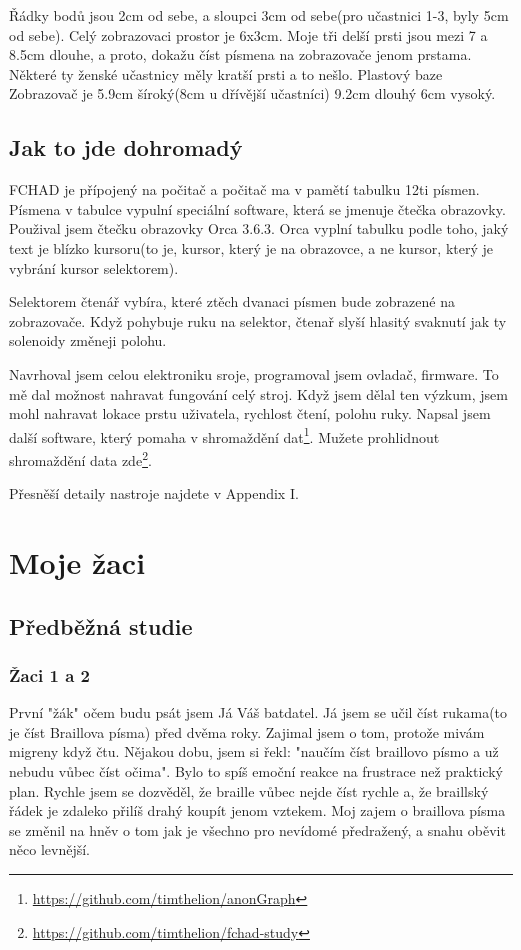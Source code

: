 Řádky bodů jsou 2cm od sebe, a sloupci 3cm od sebe(pro učastnici 1-3, byly 5cm od sebe).  Celý zobrazovaci prostor je 6x3cm.  Moje tři delší prsti jsou mezi 7 a 8.5cm dlouhe, a proto, dokažu číst písmena na zobrazovače jenom prstama.  Některé ty ženské učastnicy měly kratší prsti a to nešlo.  Plastový baze Zobrazovač je 5.9cm šíroký(8cm u dřívější učastníci) 9.2cm dlouhý 6cm vysoký.

\subsection{Jak to jde dohromadý}

FCHAD je přípojený na počitač a počitač ma v pamětí tabulku 12ti písmen.  Písmena v tabulce vypulní speciální software, která se jmenuje čtečka obrazovky.  Použival jsem čtečku obrazovky Orca 3.6.3. Orca vyplní tabulku podle toho, jaký text je blízko kursoru(to je, kursor, který je na obrazovce, a ne kursor, který je vybrání kursor selektorem).

Selektorem čtenář vybíra, které ztěch dvanaci písmen bude zobrazené na zobrazovače. Když pohybuje ruku na selektor, čtenař slyší hlasitý svaknutí jak ty solenoidy změneji polohu.

Navrhoval jsem celou elektroniku sroje, programoval jsem ovladač, firmware.  To mě dal možnost nahravat fungování celý stroj.  Když jsem dělal ten výzkum, jsem mohl nahravat lokace prstu uživatela, rychlost čtení, polohu ruky.  Napsal jsem další software, který pomaha v shromaždění dat\footnote{\url{https://github.com/timthelion/anonGraph}}.  Mužete prohlidnout shromaždění data zde\footnote{\url{https://github.com/timthelion/fchad-study}}.

Přesněší detaily nastroje najdete v Appendix I.

\section{Moje žaci}

\subsection{Předběžná studie}

\subsubsection{Žaci 1 a 2}

První "žák" očem budu psát jsem Já Váš batdatel.  Já jsem se učil číst rukama(to je číst Braillova písma) před dvěma roky. Zajimal jsem o tom, protože mivám migreny když čtu.  Nějakou dobu, jsem si řekl: "naučím číst braillovo písmo a už nebudu vůbec číst očima".  Bylo to spíš emoční reakce na frustrace než praktický plan.  Rychle jsem se dozvěděl, že braille vůbec nejde číst rychle a, že braillský řádek je zdaleko přilíš drahý koupít jenom vztekem.  Moj zajem o braillova písma se změnil na hněv o tom jak je všechno pro nevídomé předražený, a snahu oběvit něco levnější.

